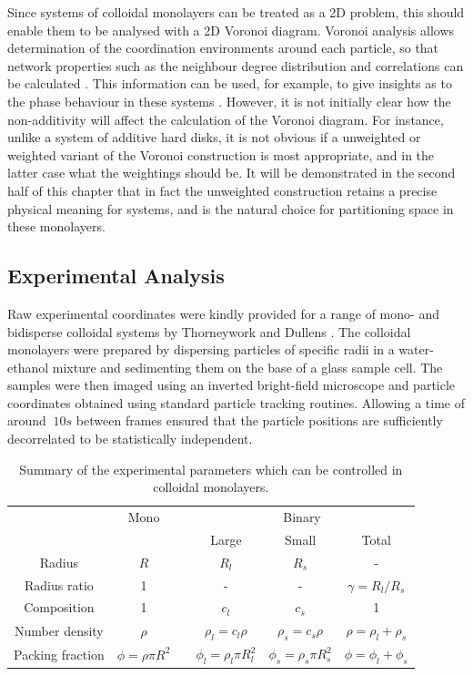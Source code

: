 Since systems of colloidal monolayers can be treated as a 2D problem, this should enable them to be analysed with a 2D Voronoi diagram.
Voronoi analysis allows determination of the coordination environments around each particle, so that network properties such as the neighbour degree distribution and correlations can be calculated \cite{Earnshaw1994,Yang2002,Kumar2005,Chremos2007}.
This information can be used, for example, to give insights as to the phase behaviour in these systems \cite{Jaster1999,Pronk2004,Kapfer2015,Thorneywork2017}.
However, it is not initially clear how the non\--additivity will affect the calculation of the Voronoi diagram.
For instance, unlike a system of additive hard disks, it is not obvious if a unweighted or weighted variant of the Voronoi construction is most appropriate, and in the latter case what the weightings should be.
It will be demonstrated in the second half of this chapter that in fact the unweighted construction retains a precise physical meaning for \qtd{} systems, and is the natural choice for partitioning space in these monolayers.

\subsection{Experimental Analysis}

Raw experimental coordinates were kindly provided for a range of mono\-- and bidisperse colloidal systems by Thorneywork and Dullens \cite{Thorneywork2014,Thorneywork2017,alice2015a}.
The colloidal monolayers were prepared by dispersing particles of specific radii in a water\--ethanol mixture and sedimenting them on the base of a glass sample cell.
The samples were then imaged using an inverted bright-field microscope and particle coordinates obtained using standard particle tracking routines.
Allowing a time of around $~10s$ between frames ensured that the particle positions are sufficiently decorrelated to be statistically independent. 

\begin{table}
\centering
\caption{Summary of the experimental parameters which can be controlled in colloidal monolayers.}
\label{tab:expcolloidparams}
\begin{tabular}{@{}cccccc@{}}
\toprule
& \multicolumn{1}{c}{Mono} & \phantom{x} & \multicolumn{3}{c}{Binary} \\ 
\cmidrule{2-2} \cmidrule{4-6} 
& & & Large & Small & Total \\ 
\midrule
Radius & $R$ & & $R_l$ & $R_s$ & - \\
Radius ratio & 1 & & - & - & $\gamma=R_l/R_s$ \\
Composition & 1 & & $c_l$ & $c_s$ & 1 \\
Number density & $\rho$ & & $\rho_l=c_l\rho$ & $\rho_s=c_s\rho$ & $\rho=\rho_l+\rho_s$ \\
Packing fraction & $\phi=\rho\pi R^2$ & & $\phi_l=\rho_l\pi R_l^2$ & $\phi_s=\rho_s\pi R_s^2$ & $\phi=\phi_l+\phi_s$ \\
\bottomrule
\end{tabular}
\end{table}

